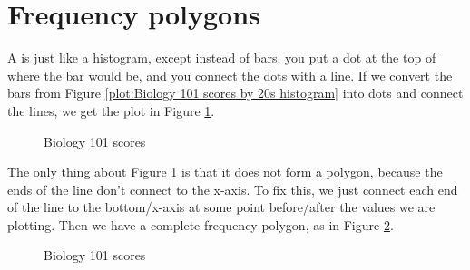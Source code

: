 \documentclass[../../../main.tex]{subfiles}
\begin{document}
\section{Frequency polygons}

A  is just like a histogram, except instead of bars, you put a dot at the top of where the bar would be, and you connect the dots with a line. If we convert the bars from Figure \ref{plot:Biology 101 scores by 20s histogram} into dots and connect the lines, we get the plot in Figure \ref{plot:Biology 101 scores by 20s polygon beta}.

\begin{figure}[ht]
  \caption{\label{plot:Biology 101 scores by 20s polygon beta} Biology 101 scores}
\end{figure}

The only thing about Figure \ref{plot:Biology 101 scores by 20s polygon beta} is that it does not form a polygon, because the ends of the line don't connect to the x-axis. To fix this, we just connect each end of the line to the bottom/x-axis at some point before/after the values we are plotting. Then we have a complete frequency polygon, as in Figure \ref{plot:Biology 101 scores by 20s polygon}.

\begin{figure}[ht]
  \caption{\label{plot:Biology 101 scores by 20s polygon} Biology 101 scores}
\end{figure}
\end{document}
